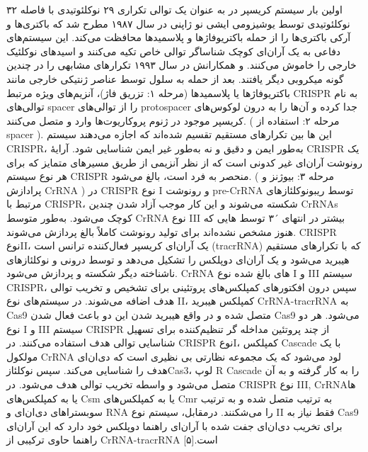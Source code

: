 \documentclass[12pt,a4paper,BCOR=.7cm,headsepline,bibliography=totoc]{report}
\begin{document}
اولین بار سیستم کریسپر در
 به عنوان یک توالی تکراری ۲۹ نوکلئوتیدی با فاصله ۳۲ نوکلئوتیدی توسط یوشیزومی ایشی نو ژاپنی در سال ۱۹۸۷ مطرح شد که باکتری‌ها و آرکی باکتری‌ها را از حمله باکتریوفاژها و پلاسمیدها محافظت می‌کند. این سیستم‌های دفاعی به یک آر‌ان‌ای کوچک شناساگر توالی خاص تکیه می‌کنند و اسیدهای نوکلئیک خارجی را خاموش می‌کنند.
\cite{Ishino} 
 و همکارانش در سال ۱۹۹۳ تکرارهای مشابهی را در چندین گونه میکروبی دیگر یافتند.\cite{Mojica}
بعد از حمله به سلول توسط عناصر ژنتیکی خارجی مانند باکتریوفاژها یا پلاسمیدها (مرحله ۱: تزریق فاژ)، آنزیم‌های ویژه مرتبط CRISPR
 به نام
 توالی‌های spacer را از توالی‌های protospacer جدا کرده و آن‌ها را به درون لوکوس‌های کریسپر موجود در ژنوم پروکاریوت‌ها وارد و متصل می‌کنند. ( مرحله ۲: استفاده از spacer ). این 
ها
 بین تکرارهای مستقیم تقسیم شده‌اند که اجازه می‌دهند سیستم CRISPR، به‌طور ایمن و دقیق و نه به‌طور غیر ایمن شناسایی شود. آرایهٔ CRISPR یک رونوشت آر‌ان‌ای غیر کدونی است که از نظر آنزیمی از طریق مسیرهای متمایز که برای هر نوع سیستم CRISPR منحصر به فرد است، بالغ می‌شود. ( مرحله ۳: بیوژنز و پرادازش CrRNA ) در CRISPR نوع I و
رونوشت pre-CrRNA توسط ریبونوکلئازهای مرتبط با CRISPR، شکسته می‌شوند و این کار موجب آزاد شدن چندین CrRNAs کوچک می‌شود. به‌طور متوسط CrRNA نوع III بیشتر در انتهای ´۳ توسط
 هایی 
که هنوز مشخص نشده‌اند برای تولید رونوشت کاملاً بالغ پردازش می‌شوند. CRISPR نوعII، یک آر‌ان‌ای کریسپر فعال‌کننده ترانس است (tracrRNA) که با تکرارهای مستقیم هیبرید می‌شود و یک آر‌ان‌ای دوپلکس را تشکیل می‌دهد و توسط 
 درونی و نوکلئازهای ناشناخته دیگر شکسته و پردازش می‌شود. CrRNA های بالغ شده نوع I و III سیستم CRISPR، سپس درون افکتورهای کمپلکس‌های پروتئینی برای تشخیص و تخریب توالی هدف اضافه می‌شوند. در سیستم‌های نوع II، کمپلکس هیبرید CrRNA-tracrRNA به Cas9 متصل شده و در واقع هیبرید شدن این دو باعث فعال شدن Cas9 می‌شود. هر دو نوع I و III سیستم CRISPR از چند پروتئین مداخله گر تنظیم‌کننده برای تسهیل شناسایی توالی هدف استفاده می‌کنند. در CRISPR نوعI، کمپلکس Cascade با یک مولکول CrRNA لود می‌شود که یک مجموعه نظارتی بی نظیری است که دی‌ان‌ای هدف را شناسایی می‌کند. سپس نوکلئازCas3، لوپ R Cascade را به کار گرفته و به آن متصل می‌شود و واسطه تخریب توالی هدف می‌شود. در CRISPR نوع III, CrRNAها یا به کمپلکس‌های Csm یا به کمپلکس‌های Cmr به ترتیب متصل شده و به ترتیب سوبستراهای دی‌ان‌ای و RNA را می‌شکنند. درمقابل، سیستم نوع II فقط نیاز به Cas9 برای تخریب دی‌ان‌ای جفت شده با آر‌ان‌ای راهنما دوپلکس خود دارد که این آر‌ان‌ای راهنما حاوی ترکیبی از CrRNA-tracrRNA است.[۵]
\end{document}
